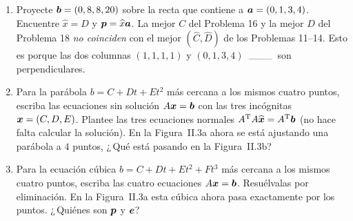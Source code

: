 \documentclass[12pt,a4paper]{article}
\newcommand\bwxhat{\widehat{\bi x}}
\newcommand\wxhat{\widehat{x}}
\newcommand{\bi}[1]{\hbox{\boldmath$#1$}}
\newcommand\1{\mbox{\,\vrule height-0.8pt depth1.0pt width2pc\,}}
\newcommand\2{\mbox{\,\vrule height-0.8pt depth1.0pt width1pc\,}}
\DeclareRobustCommand\transp{^{\mathrm{T}}}
\begin{document}
\begin{enumerate}
\item Proyecte $\bi b=(0,8,8,20)$ sobre la recta que contiene a $\bi a=  (0,1,3,4)$.  Encuentre $\wxhat = D$ y $\bi p=\wxhat \bi a$. La mejor $C$ del Problema 16 y la mejor $D$ del Problema 18 \emph{no coinciden} con el mejor $(\widehat{C},\widehat{D})$ de los Problemas 11--14.  Esto es porque las dos columnas $(1,1,1,1)$ y $(0,1,3,4)$ $\1$ son perpendiculares.

\item Para la parábola $b=C+Dt+Et^2$ más cercana a los mismos cuatro puntos, escriba las ecuaciones sin solución $A\bi x=\bi b$ con las tres incógnitas $\bi x = (C, D, E)$. Plantee las tres ecuaciones normales $A\transp A\bwxhat=A\transp \bi b$ (no hace falta calcular la solución). En la Figura~II.3a ahora se está ajustando una parábola a $4$ puntos, ¿\,Qué está pasando en la Figura~II.3b?

\item Para la ecuaci\'on cúbica $b=C+Dt+Et^2+Ft^3$ más cercana a los mismos cuatro puntos, escriba las cuatro ecuaciones $A\bi x=\bi b$.  Resuélvalas por eliminación. En la Figura~II.3a esta cúbica ahora pasa exactamente por los puntos. ¿\,Quiénes son $\bi p$ y $\bi e$?


\end{enumerate}
\end{document}
